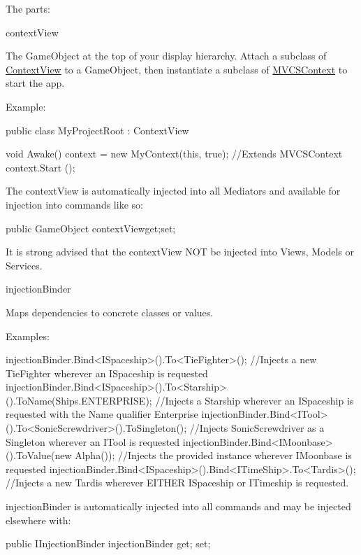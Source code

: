 The parts\-: 
\begin{DoxyItemize}
\item context\-View

The Game\-Object at the top of your display hierarchy. Attach a subclass of \hyperlink{classstrange_1_1extensions_1_1context_1_1impl_1_1_context_view}{Context\-View} to a Game\-Object, then instantiate a subclass of \hyperlink{classstrange_1_1extensions_1_1context_1_1impl_1_1_m_v_c_s_context}{M\-V\-C\-S\-Context} to start the app.

Example\-: \begin{DoxyVerb}public class MyProjectRoot : ContextView
{

    void Awake()
    {
        context = new MyContext(this, true); //Extends MVCSContext
        context.Start ();
    }
}
\end{DoxyVerb}


The context\-View is automatically injected into all Mediators and available for injection into commands like so\-: \begin{DoxyVerb}
public GameObject contextView{get;set;}
\end{DoxyVerb}


It is strong advised that the context\-View N\-O\-T be injected into Views, Models or Services.


\item injection\-Binder

Maps dependencies to concrete classes or values.

Examples\-: \begin{DoxyVerb}injectionBinder.Bind<ISpaceship>().To<TieFighter>(); //Injects a new TieFighter wherever an ISpaceship is requested
injectionBinder.Bind<ISpaceship>().To<Starship>().ToName(Ships.ENTERPRISE); //Injects a Starship wherever an ISpaceship is requested with the Name qualifier Enterprise
injectionBinder.Bind<ITool>().To<SonicScrewdriver>().ToSingleton(); //Injects SonicScrewdriver as a Singleton wherever an ITool is requested
injectionBinder.Bind<IMoonbase>().ToValue(new Alpha()); //Injects the provided instance wherever IMoonbase is requested
injectionBinder.Bind<ISpaceship>().Bind<ITimeShip>.To<Tardis>(); //Injects a new Tardis wherever EITHER ISpaceship or ITimeship is requested.
\end{DoxyVerb}


{\ttfamily injection\-Binder} is automatically injected into all commands and may be injected elsewhere with\-: \begin{DoxyVerb}[Inject]
public IInjectionBinder injectionBinder{ get; set;}
\end{DoxyVerb}




\end{DoxyItemize}
